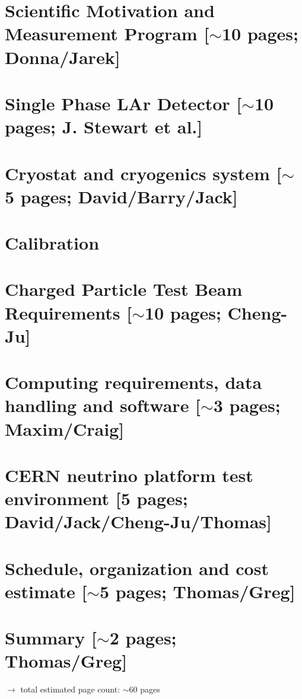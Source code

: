 \documentclass[12pt]{article}
\begin{document}
\section{Scientific Motivation and Measurement Program [$\sim$10 pages; {\color{red} Donna/Jarek}]}
	
	

\section{Single Phase LAr Detector [$\sim$10 pages; {\color{red} J. Stewart et al.}]}
\rm

	


\section{Cryostat and cryogenics system [$\sim$5 pages; {\color{red} David/Barry/Jack}]}
	
	
\section{Calibration}
	

\newpage
\section{Charged Particle Test Beam Requirements [$\sim$10 pages; {\color{red} Cheng-Ju}]}
	


\section{Computing requirements, data handling and software  [$\sim$3 pages; {\color{red} Maxim/Craig}]}
	

\section{CERN neutrino platform test environment [5 pages; {\color{red} David/Jack/Cheng-Ju/Thomas}]}
	
	
	
\section{Schedule, organization and cost estimate [$\sim$5 pages; {\color{red} Thomas/Greg}]}
	

\section{Summary [$\sim$2 pages; {\color{red} Thomas/Greg}]}
	




{\color{red}
$\rightarrow$ total estimated page count: $\sim$60 pages}
\end{document}
